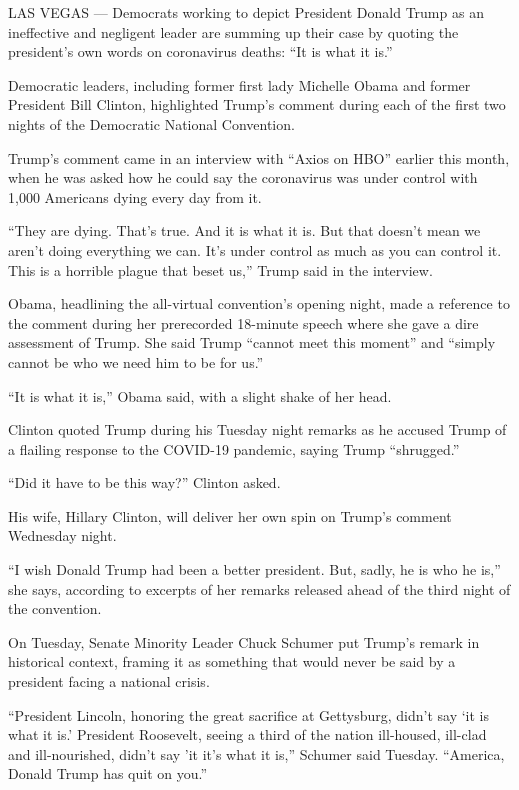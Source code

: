 LAS VEGAS --- Democrats working to depict President Donald Trump as an
ineffective and negligent leader are summing up their case by quoting
the president's own words on coronavirus deaths: ``It is what it is.''

Democratic leaders, including former first lady Michelle Obama and
former President Bill Clinton, highlighted Trump's comment during each
of the first two nights of the Democratic National Convention.

Trump's comment came in an interview with ``Axios on HBO'' earlier this
month, when he was asked how he could say the coronavirus was under
control with 1,000 Americans dying every day from it.

``They are dying. That's true. And it is what it is. But that doesn't
mean we aren't doing everything we can. It's under control as much as
you can control it. This is a horrible plague that beset us,'' Trump
said in the interview.

Obama, headlining the all-virtual convention's opening night, made a
reference to the comment during her prerecorded 18-minute speech where
she gave a dire assessment of Trump. She said Trump ``cannot meet this
moment'' and ``simply cannot be who we need him to be for us.''

``It is what it is,'' Obama said, with a slight shake of her head.

Clinton quoted Trump during his Tuesday night remarks as he accused
Trump of a flailing response to the COVID-19 pandemic, saying Trump
``shrugged.''

``Did it have to be this way?'' Clinton asked.

His wife, Hillary Clinton, will deliver her own spin on Trump's comment
Wednesday night.

``I wish Donald Trump had been a better president. But, sadly, he is who
he is,'' she says, according to excerpts of her remarks released ahead
of the third night of the convention.

On Tuesday, Senate Minority Leader Chuck Schumer put Trump's remark in
historical context, framing it as something that would never be said by
a president facing a national crisis.

``President Lincoln, honoring the great sacrifice at Gettysburg, didn't
say `it is what it is.' President Roosevelt, seeing a third of the
nation ill-housed, ill-clad and ill-nourished, didn't say 'it it's what
it is,'' Schumer said Tuesday. ``America, Donald Trump has quit on
you.''

